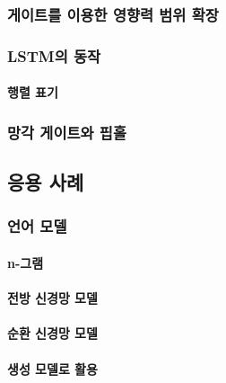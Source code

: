 \documentclass [12pt] {oblivoir}
\let\oldsubsubsection=\subsubsection
\renewcommand{\subsubsection}
{
  \filbreak
  \oldsubsubsection
}
\begin{document}
\subsubsection{게이트를 이용한 영향력 범위 확장}

\subsubsection{LSTM의 동작}

\paragraph*{행렬 표기}\mbox{}

\vspace{3mm}

\subsubsection{망각 게이트와 핍홀}

\subsection{응용 사례}

\subsubsection{언어 모델}

\paragraph*{n-그램}\mbox{}

\vspace{3mm}

\paragraph*{전방 신경망 모델}\mbox{}

\vspace{3mm}

\paragraph*{순환 신경망 모델}\mbox{}

\vspace{3mm}

\paragraph*{생성 모델로 활용}\mbox{}
\end{document}
